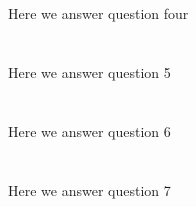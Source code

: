 \documentclass[10pt,a4paper]{article}
\begin{document}
\section{}
Here we answer question four
\section{}
Here we answer question 5
\section{}
Here we answer question 6
\section{}
Here we answer question 7
\end{document}
